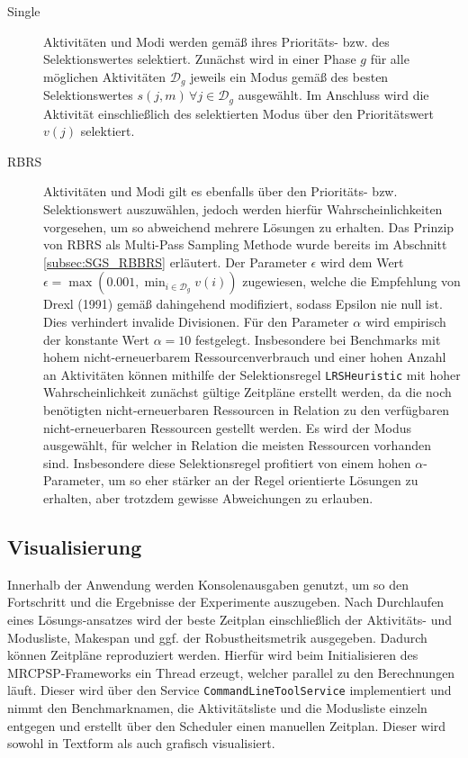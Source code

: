 \begin{description}
\item[Single] Aktivitäten und Modi werden gemäß ihres Prioritäts- bzw. des Selektionswertes selektiert. Zunächst wird in einer Phase $g$ für alle möglichen Aktivitäten $\mathcal{D}_g$ jeweils ein Modus gemäß des besten Selektionswertes $s(j, m) \, \forall j \in \mathcal{D}_g$ ausgewählt. Im Anschluss wird die Aktivität einschließlich des selektierten Modus über den Prioritätswert $v(j)$ selektiert. 
\item[\acf{RBRS}] Aktivitäten und Modi gilt es ebenfalls über den Prioritäts- bzw. Selektionswert auszuwählen, jedoch werden hierfür Wahrscheinlichkeiten vorgesehen, um so abweichend mehrere Lösungen zu erhalten. Das Prinzip von \ac{RBRS} als Multi-Pass Sampling Methode wurde bereits im Abschnitt \ref{subsec:SGS_RBBRS} erläutert. Der Parameter $\epsilon$ wird dem Wert $\epsilon = \max(0.001, \min_{i \in \mathcal{D}_g} v(i))$ zugewiesen, welche die Empfehlung von Drexl (1991) gemäß \cite[][S. 7]{kolisch_heuristic_1998} dahingehend modifiziert, sodass Epsilon nie null ist. Dies verhindert invalide Divisionen. Für den Parameter $\alpha$ wird empirisch der konstante Wert $\alpha = 10$ festgelegt. Insbesondere bei Benchmarks mit hohem nicht-erneuerbarem Ressourcenverbrauch und einer hohen Anzahl an Aktivitäten können mithilfe der Selektionsregel \lstinline|LRSHeuristic| mit hoher Wahrscheinlichkeit zunächst gültige Zeitpläne erstellt werden, da die noch benötigten nicht-erneuerbaren Ressourcen in Relation zu den verfügbaren nicht-erneuerbaren Ressourcen gestellt werden. Es wird der Modus ausgewählt, für welcher in Relation die meisten Ressourcen vorhanden sind. Insbesondere diese Selektionsregel profitiert von einem hohen $\alpha$-Parameter, um so eher stärker an der Regel orientierte Lösungen zu erhalten, aber trotzdem gewisse Abweichungen zu erlauben. 
\end{description}

\subsection{Visualisierung}

Innerhalb der Anwendung werden Konsolenausgaben genutzt, um so den Fortschritt und die Ergebnisse der Experimente auszugeben. Nach Durchlaufen eines Lösungs-ansatzes wird der beste Zeitplan einschließlich der Aktivitäts- und Modusliste, Makespan und ggf. der Robustheitsmetrik ausgegeben. Dadurch können Zeitpläne reproduziert werden. Hierfür wird beim Initialisieren des MRCPSP-Frameworks ein Thread erzeugt, welcher parallel zu den Berechnungen läuft. Dieser wird über den Service \lstinline|CommandLineToolService| implementiert und nimmt den Benchmarknamen, die Aktivitätsliste und die Modusliste einzeln entgegen und erstellt über den Scheduler einen manuellen Zeitplan. Dieser wird sowohl in Textform als auch grafisch visualisiert. \\

